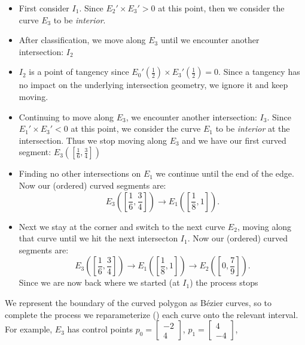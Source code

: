 \documentclass[letterpaper,10pt]{article}
\theoremstyle{definition}
\begin{document}
\begin{itemize}
\itemsep 0em
\item First consider \(I_1\). Since
  \(E_2' \times
  E_3' > 0\)
  at this point, then we consider the curve
  \(E_3\) to be
  \emph{interior}.
\item After classification, we move along
  \(E_3\) until we
  encounter another intersection: \(I_2\)
\item \(I_2\) is a point of tangency since
  \(E_0'\left(\frac{1}{2}\right) \times
  E_3'\left(\frac{1}{2}\right) = 0\).
  Since a tangency has no impact on
  the underlying intersection geometry, we ignore it and
  keep moving.
\item Continuing to move along
  \(E_3\), we
  encounter another intersection: \(I_3\).
  Since
  \(E_1' \times
  E_3' < 0\)
  at this point, we consider the curve
  \(E_1\) to be
  \emph{interior} at the intersection. Thus we stop moving
  along \(E_3\)
  and we have our first curved segment:
  \(E_3\left(\left[
    \frac{1}{6}, \frac{3}{4}\right]\right)\)
\item Finding no other intersections on \(E_1\)
  we continue until the end of the edge.
  Now our (ordered) curved segments are:
  \begin{equation}
  E_3\left(\left[
    \frac{1}{6}, \frac{3}{4}\right]\right) \longrightarrow
  E_1\left(\left[
    \frac{1}{8}, 1\right]\right).
  \end{equation}
\item Next we stay at the corner and switch to the next curve
  \(E_2\), moving along that curve
  until we hit the next intersecton \(I_1\).
  Now our (ordered) curved segments are:
  \begin{equation}
  E_3\left(\left[
    \frac{1}{6}, \frac{3}{4}\right]\right) \longrightarrow
  E_1\left(\left[
    \frac{1}{8}, 1\right]\right) \longrightarrow
  E_2\left(\left[
    0, \frac{7}{9}\right]\right).
  \end{equation}
  Since we are now back where we started (at \(I_1\))
  the process stops
\end{itemize}
We represent the boundary of the curved polygon as B\'{e}zier curves, so
to complete the process we reparameterize (\cite[Ch.~5.4]{Farin2001}) each
curve onto the relevant interval. For example,
\(E_3\) has control points
\(p_0 = \left[ \begin{array}{c} -2 \\ 4 \end{array}\right]\),
\(p_1 = \left[ \begin{array}{c} 4 \\ -4 \end{array}\right]\),
\end{document}
